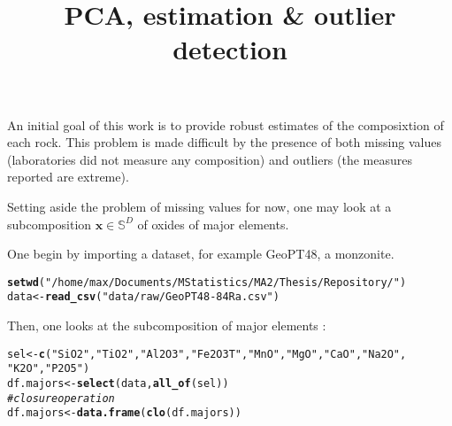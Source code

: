 \documentclass[a4paper,oneside,12pt,titlepage]{article}\usepackage[]{graphicx}\usepackage[]{color}
\title{PCA, estimation \& outlier detection}
\makeatletter
\newcommand{\hlstr}[1]{\textcolor[rgb]{0.192,0.494,0.8}{#1}}%
\newcommand{\hlcom}[1]{\textcolor[rgb]{0.678,0.584,0.686}{\textit{#1}}}%
\newcommand{\hlstd}[1]{\textcolor[rgb]{0.345,0.345,0.345}{#1}}%
\newcommand{\hlkwb}[1]{\textcolor[rgb]{0.69,0.353,0.396}{#1}}%
\newcommand{\hlkwd}[1]{\textcolor[rgb]{0.737,0.353,0.396}{\textbf{#1}}}%
\newenvironment{kframe}{%
 \def\at@end@of@kframe{}%
 \ifinner\ifhmode%
  \def\at@end@of@kframe{\end{minipage}}%
  \begin{minipage}{\columnwidth}%
 \fi\fi%
 \def\FrameCommand##1{\hskip\@totalleftmargin \hskip-\fboxsep
 \colorbox{shadecolor}{##1}\hskip-\fboxsep
     \hskip-\linewidth \hskip-\@totalleftmargin \hskip\columnwidth}%
 \MakeFramed {\advance\hsize-\width
   \@totalleftmargin\z@ \linewidth\hsize
   \@setminipage}}%
 {\par\unskip\endMakeFramed%
 \at@end@of@kframe}
\newenvironment{knitrout}{}{} %
\makeatother
\begin{document}
\maketitle


An initial goal of this work is to provide robust estimates of the composixtion of each rock. This problem is made difficult by the presence of both missing values (laboratories did not measure any composition) and outliers (the measures reported are extreme).

Setting aside the problem of missing values for now, one may look at a subcomposition $\mathbf{x} \in \mathbb{S}^D$ of oxides of major elements.

One begin by importing a dataset, for example GeoPT48, a monzonite.


\begin{knitrout}
\color{fgcolor}\begin{kframe}
\begin{alltt}
\hlkwd{setwd}\hlstd{(}\hlstr{"/home/max/Documents/MStatistics/MA2/Thesis/Repository/"}\hlstd{)}
\hlstd{data} \hlkwb{<-} \hlkwd{read_csv}\hlstd{(}\hlstr{"data/raw/GeoPT48 -84Ra.csv"}\hlstd{)}
\end{alltt}


{\ttfamily\noindent\itshape\color{messagecolor}{\#\# \\\#\# -- Column specification --------------------------------------------------------\\\#\# cols(\\\#\# \ \ .default = col\_double(),\\\#\# \ \ Laboratory = col\_character(),\\\#\# \ \ Au = col\_logical(),\\\#\# \ \ N = col\_logical(),\\\#\# \ \ Os = col\_logical()\\\#\# )\\\#\# i Use `spec()` for the full column specifications.}}\end{kframe}
\end{knitrout}
Then, one looks at the subcomposition of major elements :
\begin{knitrout}
\color{fgcolor}\begin{kframe}
\begin{alltt}
\hlstd{sel} \hlkwb{<-}\hlkwd{c}\hlstd{(}\hlstr{"SiO2"}\hlstd{,}\hlstr{"TiO2"}\hlstd{,}\hlstr{"Al2O3"}\hlstd{,}\hlstr{"Fe2O3T"}\hlstd{,}\hlstr{"MnO"}\hlstd{,}\hlstr{"MgO"}\hlstd{,}\hlstr{"CaO"}\hlstd{,}\hlstr{"Na2O"}\hlstd{,}
        \hlstr{"K2O"}\hlstd{,}\hlstr{"P2O5"}\hlstd{)}
\hlstd{df.majors} \hlkwb{<-} \hlkwd{select}\hlstd{(data,}\hlkwd{all_of}\hlstd{(sel))}
\hlcom{# closure operation}
\hlstd{df.majors} \hlkwb{<-} \hlkwd{data.frame}\hlstd{(}\hlkwd{clo}\hlstd{(df.majors))}
\end{alltt}
\end{kframe}
\end{knitrout}
\end{document}
